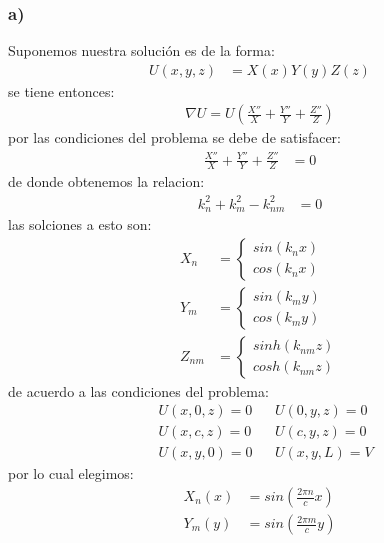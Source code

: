 \documentclass{article}
\begin{document}
\begin{tcolorbox}[breakable]
    \subsubsection*{a)}
    Suponemos nuestra solución es de la forma:
    \begin{align*}
        U(x,y,z) &= X(x)Y(y)Z(z)
    \end{align*}
    se tiene entonces:
    \begin{align*}
        \nabla U = U \left( \frac{X''}{X} + \frac{Y''}{Y} + \frac{Z''}{Z}  \right)
    \end{align*}
    por las condiciones del problema se debe de satisfacer:
    \begin{align*}
        \frac{X''}{X} + \frac{Y''}{Y} + \frac{Z''}{Z} &= 0
    \end{align*}
    de donde obtenemos la relacion: 
    \begin{align*}
        k_n^2 + k_m^2 - k_{nm}^2 &= 0
    \end{align*}
    las solciones a esto son:
    \begin{align*}
        X_n &= 
        \begin{cases}
            sin(k_nx) \\
            cos(k_nx) 
        \end{cases} \\
        Y_m &=
        \begin{cases}
            sin(k_my) \\ 
            cos(k_my)
        \end{cases} \\
        Z_{nm} &=
        \begin{cases}
            sinh(k_{nm}z) \\
            cosh(k_{nm}z)
        \end{cases} 
    \end{align*}
    de acuerdo a las condiciones del problema:
    \begin{align*}
        &U(x,0,z) = 0 &&U(0,y,z) = 0 \\
        &U(x,c,z) = 0 &&U(c,y,z) = 0 \\ 
        &U(x,y,0) = 0 &&U(x,y,L) = V
    \end{align*}
    por lo cual elegimos:
    \begin{align*}
        X_n(x) &= sin\left( \frac{2\pi n}{c} x\right) \\
        Y_m(y) &= sin\left( \frac{2\pi m}{c} y\right) \\

\end{align*}
\end{tcolorbox}
\end{document}
